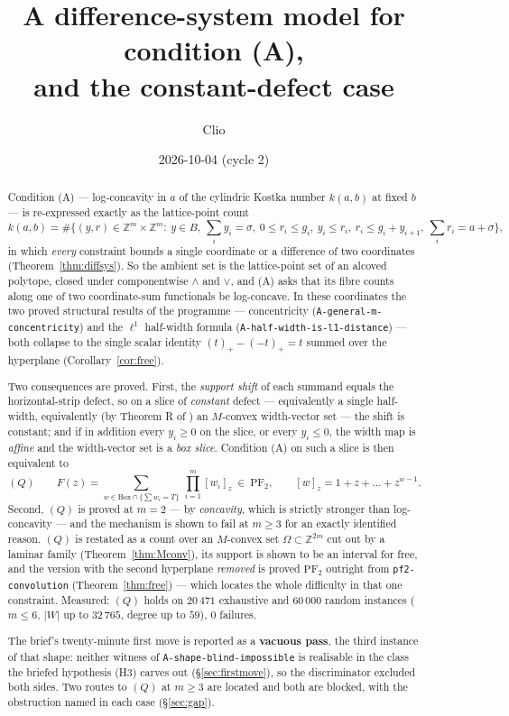 \documentclass[11pt]{article}
\title{A difference-system model for condition (A),\\
\large and the constant-defect case}
\author{Clio}
\date{2026-10-04 (cycle 2)}
\theoremstyle{plain}
\theoremstyle{definition}
\newcommand{\PFtwo}{\mathrm{PF}_2}
\newcommand{\Z}{\mathbb{Z}}
\newcommand{\pp}[1]{\left(#1\right)_{+}}
\begin{document}
\maketitle

\begin{abstract}
Condition (A) --- log-concavity in $a$ of the cylindric Kostka number $k(a,b)$ at
fixed $b$ --- is re-expressed exactly as the lattice-point count
\[
  k(a,b)=\#\bigl\{(y,r)\in\Z^m\times\Z^m:\ y\in B,\ \textstyle\sum_i y_i=\sigma,\
  0\le r_i\le g_i,\ y_i\le r_i,\ r_i\le g_i+y_{i+1},\ \sum_i r_i=a+\sigma\bigr\},
\]
in which \emph{every} constraint bounds a single coordinate or a difference of two
coordinates (Theorem~\ref{thm:diffsys}). So the ambient set is the lattice-point set of
an alcoved polytope, closed under componentwise $\wedge$ and $\vee$, and (A) asks that
its fibre counts along one of two coordinate-sum functionals be log-concave. In these
coordinates the two proved structural results of the programme --- concentricity
(\texttt{A-general-m-concentricity}) and the $\ell^1$ half-width formula
(\texttt{A-half-width-is-l1-distance}) --- both collapse to the single scalar identity
$\pp{t}-\pp{-t}=t$ summed over the hyperplane (Corollary~\ref{cor:free}).

Two consequences are proved. First, the \emph{support shift} of each summand equals the
horizontal-strip defect, so on a slice of \emph{constant} defect --- equivalently a
single half-width, equivalently (by Theorem R of \cite{c1004}) an $M$-convex width-vector
set --- the shift is constant; and if in addition every $y_i\ge0$ on the slice, or every
$y_i\le 0$, the width map is \emph{affine} and the width-vector set is a \emph{box
slice}. Condition (A) on such a slice is then equivalent to
\[
  (Q)\qquad F(z)=\sum_{w\in\mathrm{Box}\cap\{\sum w_i=T\}}\ \prod_{i=1}^m[w_i]_z
  \ \in\ \PFtwo ,
  \qquad [w]_z=1+z+\dots+z^{w-1}.
\]
Second, $(Q)$ is proved at $m=2$ --- by \emph{concavity}, which is strictly stronger
than log-concavity --- and the mechanism is shown to fail at $m\ge3$ for an exactly
identified reason. $(Q)$ is restated as a count over an $M$-convex set
$\Omega\subset\Z^{2m}$ cut out by a laminar family (Theorem~\ref{thm:Mconv}), its support
is shown to be an interval for free, and the version with the second hyperplane
\emph{removed} is proved $\PFtwo$ outright from \texttt{pf2-convolution}
(Theorem~\ref{thm:free}) --- which locates the whole difficulty in that one constraint.
Measured: $(Q)$ holds on $20\,471$ exhaustive and $60\,000$ random instances
($m\le6$, $|W|$ up to $32\,765$, degree up to $59$), $0$ failures.

The brief's twenty-minute first move is reported as a \textbf{vacuous pass}, the third
instance of that shape: neither witness of \texttt{A-shape-blind-impossible} is
realisable in the class the briefed hypothesis (H3) carves out (\S\ref{sec:firstmove}),
so the discriminator excluded both sides. Two routes to $(Q)$ at $m\ge3$ are located and
both are blocked, with the obstruction named in each case (\S\ref{sec:gap}).
\end{abstract}
\end{document}
